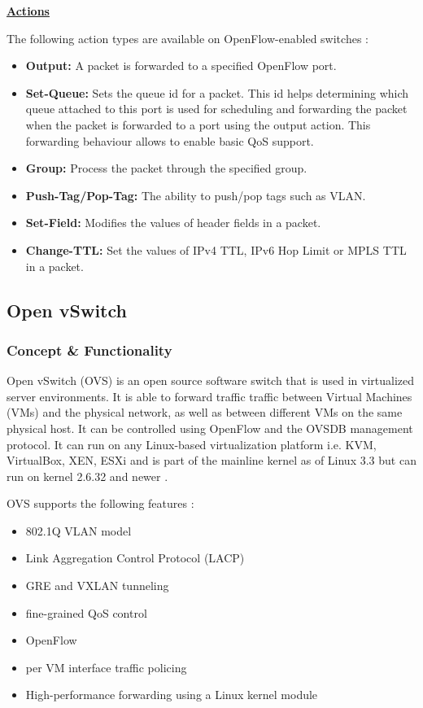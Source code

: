 \underline{\textbf{Actions}}

The following action types are available on OpenFlow-enabled switches \cite{ofspecification}:
\begin{itemize}
\item \textbf{Output:} A packet is forwarded to a specified OpenFlow port.
\item \textbf{Set-Queue:} Sets the queue id for a packet. This id helps determining which queue attached to this port is used for scheduling and forwarding the packet when the packet is forwarded to a port using the output action. This forwarding behaviour allows to enable basic QoS support.
\item \textbf{Group:} Process the packet through the specified group.
\item \textbf{Push-Tag/Pop-Tag:} The ability to push/pop tags such as VLAN.
\item \textbf{Set-Field:} Modifies the values of header fields in a packet.
\item \textbf{Change-TTL:} Set the values of IPv4 TTL, IPv6 Hop Limit or MPLS TTL in a packet.
\end{itemize} 

\subsection{Open vSwitch}


\subsubsection{Concept \& Functionality}

Open vSwitch (OVS) is an open source software switch that is used in virtualized server environments. It is able to forward traffic traffic between Virtual Machines (VMs) and the physical network, as well as between different VMs on the same physical host. It can be controlled using OpenFlow and the OVSDB management protocol. It can run on any Linux-based virtualization platform i.e. KVM, VirtualBox, XEN, ESXi and is part of the mainline kernel as of Linux 3.3 but can run on kernel 2.6.32 and newer \cite{ovs-faq}.

OVS supports the following features \cite{ovs-readme}:
\begin{itemize}
\item 802.1Q VLAN model
\item Link Aggregation Control Protocol (LACP)
\item GRE and VXLAN tunneling
\item fine-grained QoS control
\item OpenFlow
\item per VM interface traffic policing
\item High-performance forwarding using a Linux kernel module
\end{itemize}

